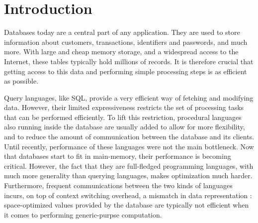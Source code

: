 \documentclass[twoside,11pt,a4paper]{article}
\newcommand{\startsection}[1]{
	\cleardoublepage
	\section{#1}
	\thispagestyle{basic}
}
\begin{document}
\listoffigures



\startsection{Introduction}
\pagestyle{content}

%

Databases today are a central part of any application. They are used to store information about customers, transactions, identifiers and passwords, and much more. With large and cheap memory storage, and a widespread access to the Internet, these tables typically hold millions of records. It is therefore crucial that getting access to this data and performing simple processing steps is as efficient as possible.%

Query languages, like SQL, provide a very efficient way of fetching and modifying data. However, their limited expressiveness restricts the set of processing tasks that can be performed efficiently. To lift this restriction, procedural languages also running inside the database are usually added to allow for more flexibility, and to reduce the amount of communication between the database and its clients. Until recently, performance of these languages were not the main bottleneck. Now that databases start to fit in main-memory, their performance is becoming critical. However, the fact that they are full-fledged programming languages, with much more generality than querying languages, makes optimization much harder. Furthermore, frequent communications between the two kinds of languages incurs, on top of context switching overhead, a mismatch in data representation : space-optimized values provided by the database are typically not efficient when it comes to performing generic-purpse computation.
\end{document}
